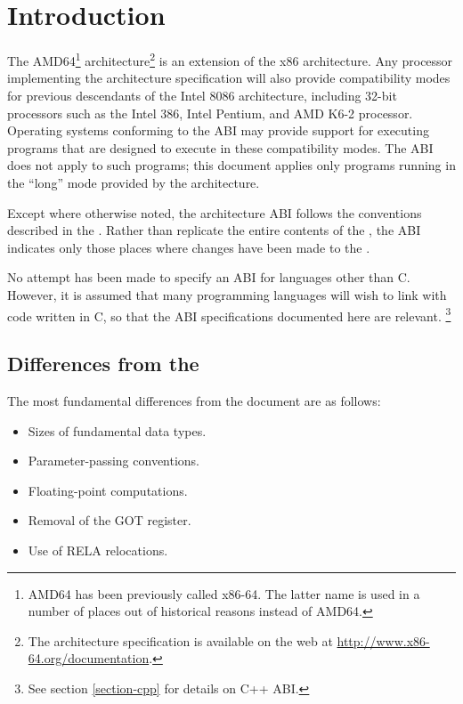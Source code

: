 \chapter{Introduction}

The AMD64\footnote{AMD64 has been previously called x86-64.  The
  latter name is used in a number of places out of historical reasons
  instead of AMD64.}  architecture\footnote{The architecture
  specification is available on the web at
  \url{http://www.x86-64.org/documentation}.} is an extension of the
x86 architecture.  Any processor implementing the \xARCH architecture
specification will also provide compatibility modes for previous
descendants of the Intel 8086 architecture, including 32-bit
processors such as the Intel 386, Intel Pentium, and AMD K6-2
processor.  Operating systems conforming to the \xARCH ABI may provide
support for executing programs that are designed to execute in these
compatibility modes.  The \xARCH ABI does not apply to such programs;
this document applies only programs running in the ``long'' mode
provided by the \xARCH architecture.

Except where otherwise noted, the \xARCH architecture ABI follows the
conventions described in the \intelabi.  Rather than replicate the
entire contents of the \intelabi, the \xARCH ABI indicates only those
places where changes have been made to the \intelabi.

No attempt has been made to specify an ABI for languages other than C.
However, it is assumed that many programming languages will wish to
link with code written in C, so
that the ABI specifications documented here are relevant.%
\footnote{See section \ref{section-cpp} for details on C++ ABI.}

\section{Differences from the \intelabi}

The most fundamental differences from the \intelabi document
are as follows:
\begin{itemize}
\item Sizes of fundamental data types.
\item Parameter-passing conventions.
\item Floating-point computations.
\item Removal of the GOT register.
\item Use of RELA relocations.
\end{itemize}

